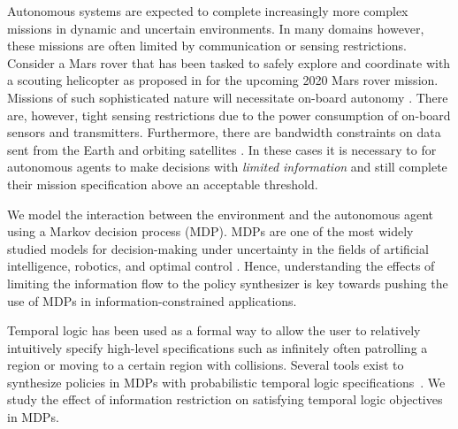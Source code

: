 Autonomous systems are expected to complete increasingly more complex missions in dynamic and uncertain environments. In many domains however, these missions are often limited by communication or sensing restrictions. Consider a Mars rover that has been tasked to safely explore and coordinate with a scouting helicopter as proposed in \cite{landau2015helicopter} for the upcoming 2020 Mars rover mission. Missions of such sophisticated nature will necessitate on-board autonomy \cite{francis2017advanced,estlin2007increased}. There are, however, tight sensing restrictions due to the power consumption of on-board sensors and transmitters. Furthermore, there are bandwidth constraints on data sent from the Earth and orbiting satellites \cite{sherwood2014,Backes1999}. In these cases it is necessary to for autonomous agents to make decisions with \emph{limited information} and still complete their mission specification above an acceptable threshold. %

We model the interaction between the environment and the autonomous agent using a Markov decision process (MDP). MDPs are one of the most widely studied models for decision-making under uncertainty in the fields of artificial intelligence, robotics, and optimal control \cite{Papadimitriou87}. Hence, understanding the effects of limiting the information flow to the policy synthesizer is key towards pushing the use of MDPs in information-constrained applications. 


Temporal logic has been used as a formal way to allow the user to relatively intuitively specify high-level specifications such as infinitely often patrolling a region or moving to a certain region with collisions. %
Several tools exist to synthesize policies in MDPs with probabilistic temporal logic specifications~\cite{Svoreňová13,Fu15}. We study the effect of information restriction on satisfying temporal logic objectives in MDPs. %

